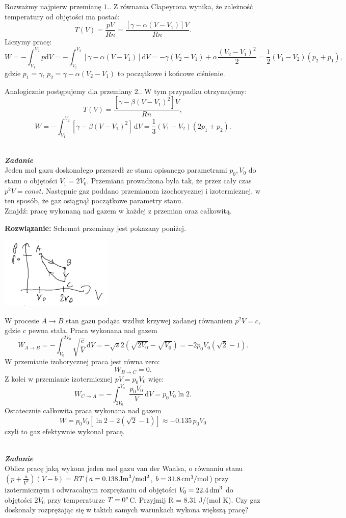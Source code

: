 \documentclass[11pt,a4paper]{article}
\newcounter{zadanie}\newcommand{\zadanie}[1][]{\addtocounter{zadanie}{1} ~\\  {\bf \emph{Zadanie \arabic{zadanie} #1 }} \\}
\renewcommand{\t}[1]{\textrm{#1}}
\begin{document}
Rozważmy najpierw przemianę $1.$. Z równania Clapeyrona wynika, że zależność temperatury od objętości ma postać:
$$
T(V) = \frac{p V}{R n} = \frac{[\gamma - \alpha(V-V_1)]V}{Rn }.
$$
Liczymy pracę:
$$
W = -\int_{V_1}^{V_2} p \t{d} V = -\int_{V_1}^{V_2} [\gamma - \alpha(V-V_1)] \t{d} V =  - \gamma(V_2 - V_1) + \alpha \frac{(V_2 - V_1)^2}{2} =
\frac{1}{2}(V_1-V_2)(p_2 +p_1),
$$
gdzie $p_1 =\gamma$, $p_2 = \gamma - \alpha(V_2-V_1)$ to początkowe i końcowe ciśnienie.

Analogicznie postępujemy dla przemiany $2.$. W tym przypadku otrzymujemy:
$$
T(V) = \frac{[\gamma - \beta(V-V_1)^2]V}{Rn },
$$
$$
W  = -\int_{V_1}^{V_2} [\gamma - \beta(V-V_1)^2]\, \t{d} V = \frac{1}{3}(V_1-V_2)(2 p_1+p_2).
$$
\newpage
\zadanie
Jeden mol gazu doskonałego przeszedł ze stanu opisanego parametrami
$p_0, V_0$ do stanu o objętości $V_1 = 2 V_0$.
Przemiana prowadzona była tak, że przez cały czas $p^2 V = const$.
Następnie gaz poddano przemianom izochorycznej i izotermicznej, w ten sposób, że gaz osiągnął
początkowe parametry stanu. \\
Znajdź: pracę wykonaną nad gazem w każdej z przemian oraz całkowitą.


\vskip 10pt
\textbf{Rozwiązanie:}
Schemat przemiany jest pokazany poniżej.
\begin{center}
\includegraphics[width=0.4\textwidth]{zad4.PNG}
\end{center}

W procesie $A\rightarrow B$ stan gazu podąża wzdłuż krzywej zadanej równaniem $p^2 V = c$, gdzie $c$ pewna stała.
Praca wykonana nad gazem
$$
W_{A\rightarrow B} = -\int_{V_0}^{2 V_0} \sqrt{\frac{c}{V}}\,\t{d}V = -\sqrt{s} 2\left( \sqrt{2 V_0} - \sqrt{V_0}\right) = -2 p_0 V_0(\sqrt{2}-1).
$$
W przemianie izohorycznej praca jest równa zero:
$$
W_{B \rightarrow C} = 0.
$$
Z kolei w przemianie izotermicznej $p V = p_0 V_0$ więc:
$$
W_{C\rightarrow A} = - \int_{2V_0}^{V_0} \frac{p_0 V_0}{V}\, \t{d} V  = p_0 V_0 \ln 2.
$$
Ostatecznie całkowita praca wykonana nad gazem
 $$W = p_0 V_0 [\ln 2 -2(\sqrt{2}-1)] \approx -0.135 \,p_0V_0$$
 czyli to gaz efektywnie wykonał pracę.
\newpage
\zadanie
Oblicz pracę jaką wykona jeden mol gazu van der Waalsa, o równaniu stanu
$(p+\frac{a}{V^2})(V-b)=RT$
($a=0.138\,\rm{Jm}^3/\rm{mol}^2$, $b=31.8\,\rm{cm^3/mol}$)
przy izotermicznym i odwracalnym rozprężaniu od objętości $V_0=22.4\,\rm{dm}^3$
do objętości $2 V_0$ przy temperaturze $T=0\degree$C.
Przyjmij R = 8.31 J/(mol K).
Czy gaz doskonały rozprężając się w takich samych warunkach wykona większą pracę?
\end{document}
